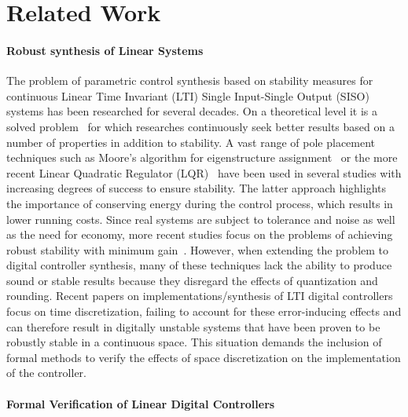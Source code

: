 \documentclass{sig-alternate-05-2015}
\begin{document}
\section{Related Work}\label{sec:related}

\paragraph{Robust synthesis of Linear Systems} 

The problem of parametric control synthesis based on stability measures for
continuous Linear Time Invariant (LTI) Single Input-Single Output (SISO)
systems has been researched for several decades.  On a theoretical level it
is a solved problem~\cite{wonham1967pole} for which researches continuously
seek better results based on a number of properties in addition to
stability.  A vast range of pole placement techniques such as Moore's
algorithm for eigenstructure assignment~\cite{klein1977eigenvalue} or the
more recent Linear Quadratic Regulator (LQR)~\cite{bemporad2002explicit}
have been used in several studies with increasing degrees of success to
ensure stability.  The latter approach highlights the importance of
conserving energy during the control process, which results in lower running
costs.  Since real systems are subject to tolerance and noise as well as the
need for economy, more recent studies focus on the problems of achieving
robust stability with minimum gain~\cite{schmid2014unified,
konigorski2012pole}.  However, when extending the problem to digital
controller synthesis, many of these techniques lack the ability to produce
sound or stable results because they disregard the effects of quantization
and rounding.  Recent papers on implementations/synthesis of LTI digital
controllers~\cite{das2013lqr,ghosh2013fpga} focus on time discretization,
failing to account for these error-inducing effects and can therefore result
in digitally unstable systems that have been proven to be robustly stable in
a continuous space.  This situation demands the inclusion of formal methods
to verify the effects of space discretization on the implementation of the
controller.

\paragraph{Formal Verification of Linear Digital Controllers} 
\end{document}
